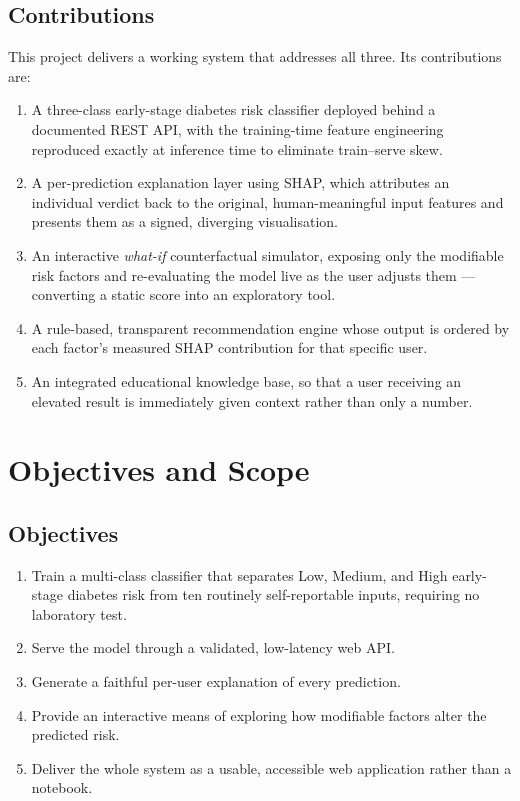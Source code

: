 \documentclass[11pt,a4paper]{article}
\begin{document}
\subsection{Contributions}
This project delivers a working system that addresses all three. Its
contributions are:

\begin{enumerate}[label=\textbf{C\arabic*.}]
  \item A three-class early-stage diabetes risk classifier deployed behind a
        documented REST API, with the training-time feature engineering
        reproduced exactly at inference time to eliminate train--serve skew.
  \item A per-prediction explanation layer using SHAP, which attributes an
        individual verdict back to the original, human-meaningful input
        features and presents them as a signed, diverging visualisation.
  \item An interactive \emph{what-if} counterfactual simulator, exposing only
        the modifiable risk factors and re-evaluating the model live as the
        user adjusts them --- converting a static score into an exploratory
        tool.
  \item A rule-based, transparent recommendation engine whose output is ordered
        by each factor's measured SHAP contribution for that specific user.
  \item An integrated educational knowledge base, so that a user receiving an
        elevated result is immediately given context rather than only a number.
\end{enumerate}

\section{Objectives and Scope}

\subsection{Objectives}
\begin{enumerate}[label=\textbf{O\arabic*.}]
  \item Train a multi-class classifier that separates Low, Medium, and High
        early-stage diabetes risk from ten routinely self-reportable inputs,
        requiring no laboratory test.
  \item Serve the model through a validated, low-latency web API.
  \item Generate a faithful per-user explanation of every prediction.
  \item Provide an interactive means of exploring how modifiable factors alter
        the predicted risk.
  \item Deliver the whole system as a usable, accessible web application rather
        than a notebook.
\end{enumerate}
\end{document}
